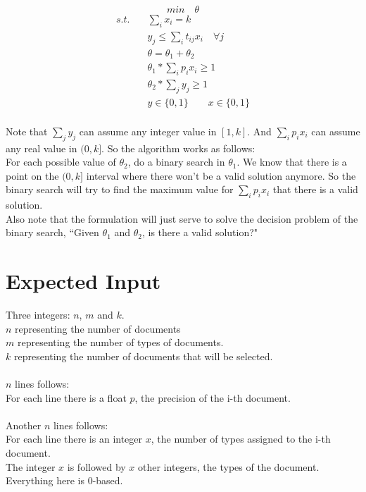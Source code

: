 \documentclass[11pt]{article}
\begin{document}
$$min \quad \theta$$
\begin{align*}
s.t. \quad &\sum_i{x_i} = k\\
           &y_j \leq \sum_i{t_{ij}x_i} \quad \forall j\\
           &\theta = \theta_1 + \theta_2\\
           &\theta_1 * \sum_i{p_ix_i} \geq 1\\
		   &\theta_2 * \sum_j{y_j} \geq 1\\
           &y \in \{0, 1\} \qquad x \in \{0, 1\}\\
\end{align*}

Note that $\sum_j{y_j}$ can assume any integer value in $[1, k]$.
And $\sum_i{p_ix_i}$ can assume any real value in $(0, k]$.
So the algorithm works as follows:\\ For each possible value of $\theta_2$, do a binary search in $\theta_1$. We know that there is a point on the $(0, k]$ interval where there won't be a valid solution anymore. So the binary search will try to find the maximum value for $\sum_i{p_ix_i}$ that there is a valid solution.\\
Also note that the formulation will just serve to solve the decision problem of the binary search, ``Given $\theta_1$ and $\theta_2$, is there a valid solution?"


\section{Expected Input}

Three integers: $n$, $m$ and $k$.\\
$n$ representing the number of documents\\
$m$ representing the number of types of documents.\\
$k$ representing the number of documents that will be selected.\\\\
$n$ lines follows:\\
For each line there is a float $p$, the precision of the i-th document.\\\\
Another $n$ lines follows:\\
For each line there is an integer $x$, the number of types assigned to the i-th document.\\
The integer $x$ is followed by $x$ other integers, the types of the document.\\

Everything here is 0-based.\\
\end{document}
